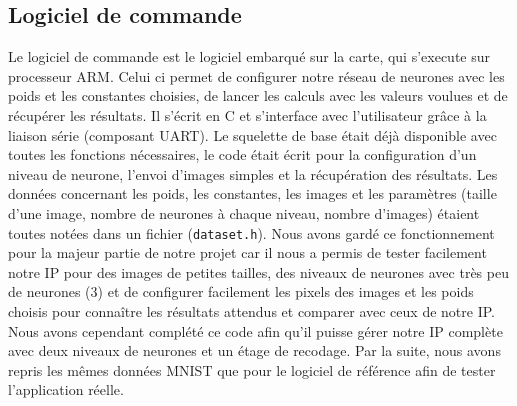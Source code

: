 \subsection{Logiciel de commande}
Le logiciel de commande est le logiciel embarqué sur la carte, qui s'execute
sur processeur ARM. Celui ci permet de configurer notre réseau de neurones avec
les poids et les constantes choisies, de lancer les calculs avec les valeurs
voulues et de récupérer les résultats. Il s'écrit en C et s'interface avec
l'utilisateur grâce à la liaison série (composant UART). Le squelette de base
était déjà disponible avec toutes les fonctions nécessaires, le code était
écrit pour la configuration d'un niveau de neurone, l'envoi d'images simples et
la récupération des résultats. Les données
concernant les poids, les constantes, les images et les paramètres (taille d'une
image, nombre de neurones à chaque niveau, nombre d'images) étaient toutes notées
dans un fichier (\texttt{dataset.h}). Nous avons gardé ce fonctionnement pour la
majeur partie de notre projet car il nous a permis de tester facilement notre
IP pour des images de petites tailles, des niveaux de neurones avec très peu
de neurones (3) et de configurer facilement les pixels des images et les poids
choisis pour connaître les résultats attendus et comparer avec ceux de notre IP.
Nous avons cependant complété ce code afin qu'il puisse gérer notre IP complète
avec deux niveaux de neurones et un étage de recodage.
Par la suite, nous avons repris les mêmes données MNIST que pour le logiciel de
référence afin de tester l'application réelle. \\

